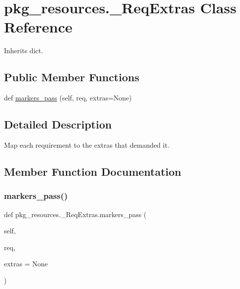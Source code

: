 \hypertarget{classpkg__resources_1_1___req_extras}{}\section{pkg\+\_\+resources.\+\_\+\+Req\+Extras Class Reference}
\label{classpkg__resources_1_1___req_extras}


Inherits dict.

\subsection*{Public Member Functions}
\begin{DoxyCompactItemize}
\item 
def \hyperlink{classpkg__resources_1_1___req_extras_a435242531f1af2132de48679c5edf3c7}{markers\+\_\+pass} (self, req, extras=None)
\end{DoxyCompactItemize}


\subsection{Detailed Description}
\begin{DoxyVerb}Map each requirement to the extras that demanded it.
\end{DoxyVerb}
 

\subsection{Member Function Documentation}
\mbox{\label{classpkg__resources_1_1___req_extras_a435242531f1af2132de48679c5edf3c7}} 
\subsubsection{\texorpdfstring{markers\+\_\+pass()}{markers\_pass()}}
{\footnotesize\ttfamily def pkg\+\_\+resources.\+\_\+\+Req\+Extras.\+markers\+\_\+pass (\begin{DoxyParamCaption}\item[{}]{self,  }\item[{}]{req,  }\item[{}]{extras = {\ttfamily None} }\end{DoxyParamCaption})}

